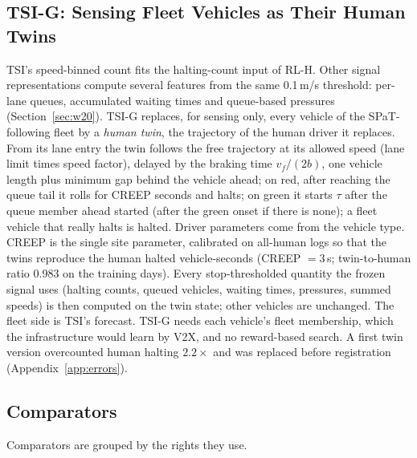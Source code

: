 \subsection{TSI-G: Sensing Fleet Vehicles as Their Human Twins}\label{sec:tsig}
TSI's speed-binned count fits the halting-count input of RL-H. Other signal representations compute several features from the same
0.1\,m/s threshold: per-lane queues, accumulated waiting times and queue-based pressures (Section~\ref{sec:w20}). TSI-G replaces, for
sensing only, every vehicle of the SPaT-following fleet by a \emph{human twin}, the trajectory of the human driver it replaces. From its
lane entry the twin follows the free trajectory at its allowed speed (lane limit times speed factor), delayed by the braking time
$v_f/(2b)$, one vehicle length plus minimum gap behind the vehicle ahead; on red, after reaching the queue tail it rolls for CREEP seconds
and halts; on green it starts $\tau$ after the queue member ahead started (after the green onset if there is none); a fleet vehicle that
really halts is halted. Driver parameters come from the vehicle type. CREEP is the single site parameter, calibrated on all-human logs so
that the twins reproduce the human halted vehicle-seconds (CREEP $=3$\,s; twin-to-human ratio 0.983 on the training days). Every
stop-thresholded quantity the frozen signal uses (halting counts, queued vehicles, waiting times, pressures, summed speeds) is then
computed on the twin state; other vehicles are unchanged. The fleet side is TSI's forecast. TSI-G needs each vehicle's fleet membership,
which the infrastructure would learn by V2X, and no reward-based search. A first twin version overcounted human halting $2.2\times$ and was
replaced before registration (Appendix~\ref{app:errors}).

\subsection{Comparators}\label{sec:comparators}
Comparators are grouped by the rights they use.
